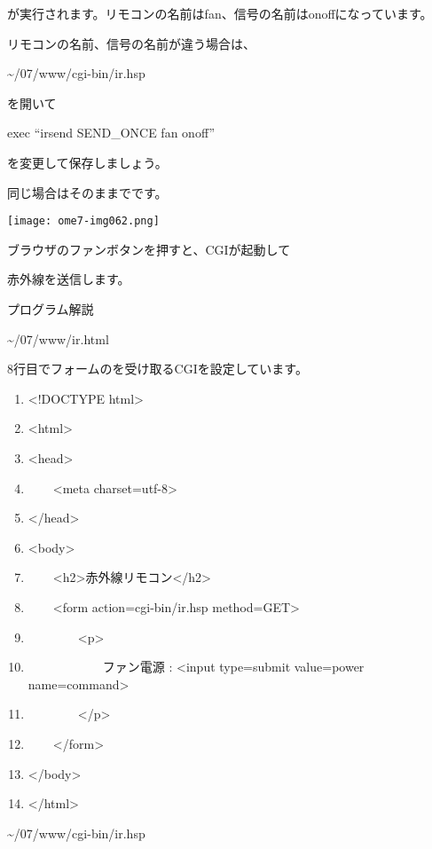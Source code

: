 が実行されます。リモコンの名前はfan、信号の名前はonoffになっています。

リモコンの名前、信号の名前が違う場合は、

{\textasciitilde}/07/www/cgi-bin/ir.hsp

を開いて

exec “irsend SEND\_ONCE fan onoff”

を変更して保存しましょう。

同じ場合はそのままでです。

%

\centering
\texttt{[image: ome7-img062.png]}
\flushleft

ブラウザのファンボタンを押すと、CGIが起動して

赤外線を送信します。


\clearpage
\noindent プログラム解説

{\textasciitilde}/07/www/ir.html

8行目でフォームのを受け取るCGIを設定しています。

\centering
\begin{boxedminipage}{0.95\textwidth}
	\begin{enumerate}
	\baselineskip 10pt
	\setlength{\itemsep}{0cm}
	\item{\textless}!DOCTYPE html{\textgreater}
	\item{\textless}html{\textgreater}
	\item{\textless}head{\textgreater}
	\item\ \ \ \ {\textless}meta charset={\textquotedbl}utf-8{\textquotedbl}{\textgreater}
	\item{\textless}/head{\textgreater}
	\item{\textless}body{\textgreater}
	\item\ \ \ \ {\textless}h2{\textgreater}赤外線リモコン{\textless}/h2{\textgreater}
	\item\ \ \ \ {\textless}form action={\textquotedbl}cgi-bin/ir.hsp{\textquotedbl}
	method={\textquotedbl}GET{\textquotedbl}{\textgreater}
	\item\ \ \ \ \ \ \ \ {\textless}p{\textgreater}
	\item\ \ \ \ \ \ \ \ \ \ \ \ ファン電源 : {\textless}input type={\textquotedbl}submit{\textquotedbl}
	value={\textquotedbl}power{\textquotedbl} name={\textquotedbl}command{\textquotedbl}{\textgreater}
	\item\ \ \ \ \ \ \ \ {\textless}/p{\textgreater}
	\item\ \ \ \ {\textless}/form{\textgreater}
	\item{\textless}/body{\textgreater}
	\item{\textless}/html{\textgreater}
	\end{enumerate}
\end{boxedminipage}
\flushleft
{\textasciitilde}/07/www/cgi-bin/ir.hsp

